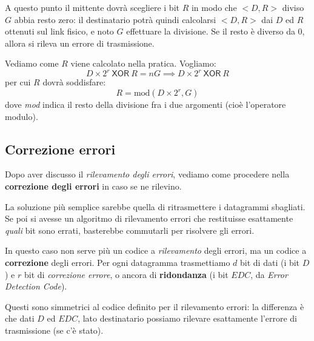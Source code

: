\documentclass[a4paper,11pt]{article}
\begin{document}
\begin{itemize}
		A questo punto il mittente dovrà scegliere i bit $R$ in modo che $<D, R>$ diviso $G$ abbia resto zero: il destinatario potrà quindi calcolarsi $<D, R>$ dai $D$ ed $R$ ottenuti sul link fisico, e noto $G$ effettuare la divisione. Se il resto è diverso da 0, allora si rileva un errore di trasmissione.

		Vediamo come $R$ viene calcolato nella pratica.
		Vogliamo:
		$$
		D \times 2^r \ \mathsf{XOR} \ R = n G \implies D \times 2^r \ \textsf{XOR} \ R
		$$
		per cui $R$ dovrà soddisfare:
		$$
		R = \text{mod}\left( D \times 2^r, G \right)
		$$
		dove \textit{mod} indica il resto della divisione fra i due argomenti (cioè l'operatore modulo).
\end{itemize}

\subsection{Correzione errori}
Dopo aver discusso il \textit{rilevamento degli errori}, vediamo come procedere nella \textbf{correzione degli errori} in caso se ne rilevino.

La soluzione più semplice sarebbe quella di ritrasmettere i datagrammi sbagliati.
Se poi si avesse un algoritmo di rilevamento errori che restituisse esattamente \textit{quali} bit sono errati, basterebbe commutarli per risolvere gli errori.

In questo caso non serve più un codice a \textit{rilevamento} degli errori, ma un codice a \textbf{correzione} degli errori.
Per ogni datagramma trasmettiamo $d$ bit di dati (i bit $D$) e $r$ bit di \textit{correzione errore}, o ancora di \textbf{ridondanza} (i bit $EDC$, da \textit{Error Detection Code}).

Questi sono simmetrici al codice definito per il rilevamento errori: la differenza è che dati $D$ ed $EDC$, lato destinatario possiamo rilevare esattamente l'errore di trasmissione (se c'è stato).
\end{document}

